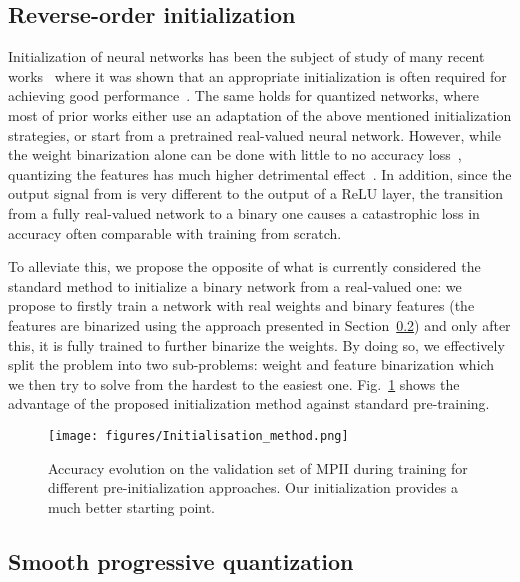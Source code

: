 \documentclass[10pt,twocolumn,letterpaper]{article}
\begin{document}
\subsection{Reverse-order initialization}\label{ssec:progressive-initialisation}

Initialization of neural networks has been the subject of study of many recent works~\cite{glorot2010understanding,he2015delving,saxe2013exact} where it was shown that an appropriate initialization is often required for achieving good performance~\cite{sutskever2013importance}. The same holds for quantized networks, where most of prior works either use an adaptation of the above mentioned initialization strategies, or start from a pretrained real-valued neural network. However, while the weight binarization alone can be done with little to no accuracy loss~\cite{rastegari2016xnor}, quantizing the features has much higher detrimental effect~\cite{rastegari2016xnor,zhou2016dorefa}. In addition, since the output signal from  is very different to the output of a ReLU layer, the transition from a fully real-valued network to a binary one causes a catastrophic loss in accuracy often comparable with training from scratch.

To alleviate this, we propose the opposite of what is currently considered the standard method to initialize a binary network from a real-valued one: we propose to firstly train a network with real weights and binary features (the features are binarized using the approach presented in Section~\ref{ssec:progressive-quantization}) and only after this, it is fully trained to further binarize the weights. By doing so, we effectively split the problem into two sub-problems: weight and feature binarization which we then try to solve from the hardest to the easiest one. Fig.~\ref{fig:init-method} shows the advantage of the proposed initialization method against standard pre-training. 

\begin{figure}[!htbp]
    \centering
    \texttt{[image: figures/Initialisation\_method.png]}
    \caption{Accuracy evolution on the validation set of MPII during training for different pre-initialization approaches. Our initialization provides a much better starting point.}
    \label{fig:init-method}
\end{figure}

\subsection{Smooth progressive quantization}\label{ssec:progressive-quantization}
\end{document}
